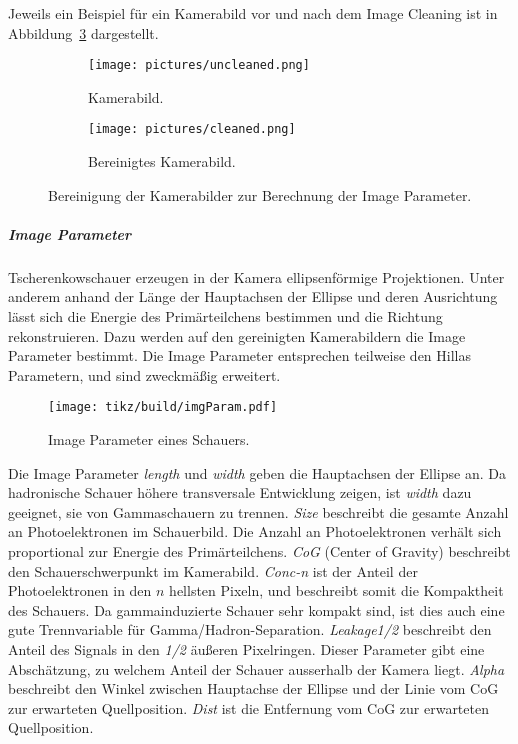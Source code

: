 Jeweils ein Beispiel für ein Kamerabild vor und nach dem Image Cleaning ist in
Abbildung~\ref{fig:cleaning} dargestellt.

\begin{figure}[ht]
  \centering
  \begin{subfigure}[c]{0.35\linewidth}
    \texttt{[image: pictures/uncleaned.png]}
    \caption{Kamerabild.}%
    \label{fig:uncleaned}
  \end{subfigure}
	\hspace{1cm}
  \begin{subfigure}[c]{0.35\linewidth}
    \texttt{[image: pictures/cleaned.png]}
    \caption{Bereinigtes Kamerabild.}%
    \label{fig:cleaned}
  \end{subfigure}
  \caption{Bereinigung der Kamerabilder zur Berechnung der Image Parameter.}%
  \label{fig:cleaning}
\end{figure}

\subparagraph{Image Parameter}%
\label{spar:image_parameter}

Tscherenkowschauer erzeugen in der Kamera ellipsenförmige Projektionen.
Unter anderem anhand der Länge der Hauptachsen der Ellipse und deren Ausrichtung
lässt sich die Energie des
Primärteilchens bestimmen und die Richtung rekonstruieren.
Dazu werden auf den gereinigten Kamerabildern die Image Parameter bestimmt.
Die Image Parameter entsprechen teilweise den Hillas Parametern,
und sind zweckmäßig erweitert.


\begin{wrapfigure}[19]{O}{0.6\textwidth}
  \centering
  \texttt{[image: tikz/build/imgParam.pdf]}
  \caption{Image Parameter eines Schauers.}%
  \label{fig:hillas}
\end{wrapfigure}

Die Image Parameter \textit{length} und \textit{width} geben die Hauptachsen
der Ellipse an.
Da hadronische Schauer höhere transversale Entwicklung zeigen, ist
\textit{width} dazu geeignet, sie von Gammaschauern zu trennen.
\textit{Size} beschreibt die gesamte Anzahl an Photoelektronen im Schauerbild.
Die Anzahl an Photoelektronen verhält sich proportional zur Energie des
Primärteilchens.
\textit{CoG} (Center of Gravity) beschreibt den Schauerschwerpunkt im Kamerabild.
\textit{Conc-n} ist der Anteil der Photoelektronen in den $n$ hellsten Pixeln,
und beschreibt somit die Kompaktheit des Schauers.
Da gammainduzierte Schauer sehr kompakt sind, ist dies auch eine gute
Trennvariable für Gamma/Hadron-Separation.
\textit{Leakage1/2} beschreibt den Anteil des Signals in den \textit{1/2} äußeren
Pixelringen.
Dieser Parameter gibt eine Abschätzung,
zu welchem Anteil der Schauer ausserhalb der Kamera liegt.
\textit{Alpha} beschreibt den Winkel zwischen Hauptachse der Ellipse und
der Linie vom CoG zur erwarteten Quellposition.
\textit{Dist} ist die Entfernung vom CoG zur erwarteten Quellposition.
